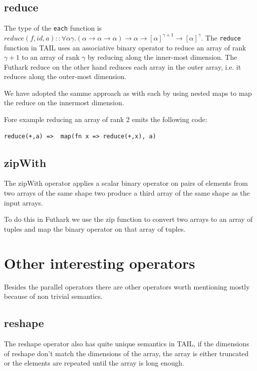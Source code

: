 \documentclass[11pt]{article}
\begin{document}
\subsection{reduce}
The type of the {\tt each} function is $reduce(f,id,a) :: \forall\alpha\gamma.(\alpha \to \alpha \to \alpha) \to \alpha \to [\alpha]^{\gamma+1} \to [\alpha]^\gamma$.
The {\tt reduce} function in TAIL uses an associative binary operator to reduce an array of rank
$\gamma+1$ to an array of rank $\gamma$ by reducing along the inner-most dimension.
The Futhark reduce on the other hand reduces each array in the outer array, i.e. it reduces along the outer-most dimension. 

We have adopted the samme approach as with each by using nested maps to map the reduce on the innermost dimension.

Fore example reducing an array of rank 2 emits the following code:

\begin{lstlisting}[numbers=none,frame=none]
reduce(+,a)	=> 	map(fn x => reduce(+,x), a)
\end{lstlisting}

\subsection{zipWith}

The zipWith operator applies a scalar binary operator on pairs of elements from two arrays of the same shape two
produce a third array of the same shape as the input arrays.

To do this in Futhark we use the zip function to convert two arrays to an array of tuples and map the binary operator on that array of tuples.

\section{Other interesting operators}

Besides the parallel operators there are other operators worth mentioning mostly because of non trivial semantics.  

\subsection{reshape}

The reshape operator also has quite unique semantics in TAIL, if the dimensions of reshape don't match the dimensions of the array, the
array is either truncated or the elements are repeated until the array is long enough.
\end{document}
